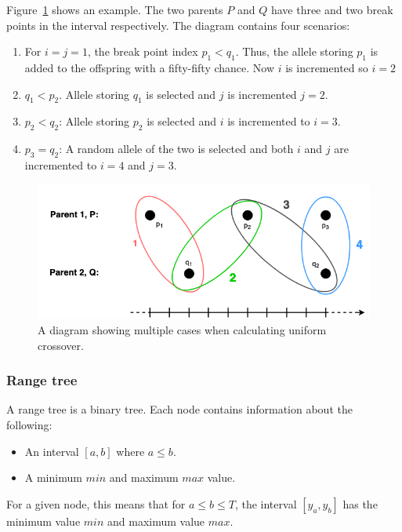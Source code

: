 \begin{description}
    Figure~\ref{fig:uniform-crossover} shows an example. The two parents $P$ and
    $Q$ have three and two break points in the interval respectively. The
    diagram contains four scenarios:
    
    \begin{enumerate}
        \item For $i = j = 1$, the break point index $p_1 < q_1$. Thus, the
        allele storing $p_1$ is added to the offspring with a fifty-fifty
        chance. Now $i$ is incremented so $i = 2$ 
        
        \item $q_1 < p_2$. Allele storing $q_1$ is selected and $j$ is
        incremented $j = 2$. 
        
        \item $p_2 < q_2$: Allele storing $p_2$ is selected and $i$ is
        incremented to $i = 3$. 
        
        \item $p_3 = q_2$: A random allele of the two is selected and both $i$
        and $j$ are incremented to $i = 4$ and $j = 3$. 
    \end{enumerate}
    
\end{description}

\begin{figure}[h]
    \centering
    \includegraphics[width=.8\textwidth]{fig/uniform-crossover.png}
    \caption{A diagram showing multiple cases when calculating uniform crossover.}
    \label{fig:uniform-crossover}
\end{figure}

\subsubsection{Range tree} \label{sec:range-tree-design}

A range tree is a binary tree. Each node contains information about the following:
\begin{itemize}
    \item An interval $[a,b]$ where $a \leq b$. 
    \item A minimum $min$ and maximum $max$ value. 
\end{itemize}
For a given node, this means that for $a \leq b \leq T$, the interval
$[y_a,y_b]$ has the minimum value $min$ and maximum value $max$. 

